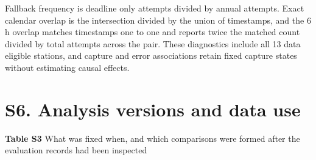 \documentclass[lineno,pdflatex,sn-apa]{sn-jnl}%
\theoremstyle{thmstyleone}%
\theoremstyle{thmstyletwo}%
\theoremstyle{thmstylethree}%
\begin{document}
Fallback frequency is deadline only attempts divided by annual attempts. Exact calendar overlap is the intersection divided by the union of timestamps, and the 6 h overlap matches timestamps one to one and reports twice the matched count divided by total attempts across the pair. These diagnostics include all 13 data eligible stations, and capture and error associations retain fixed capture states without estimating causal effects.

\section*{S6. Analysis versions and data use}

\begin{center}
\noindent\textbf{Table S3} What was fixed when, and which comparisons were formed after the evaluation records had been inspected
\end{center}
\end{document}
